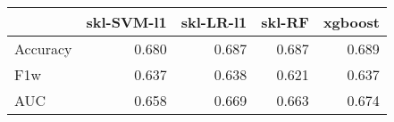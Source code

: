 \begin{tabular}{lrrrr}
\toprule
{} &  skl-SVM-l1 &  skl-LR-l1 &  skl-RF &  xgboost \\
\midrule
Accuracy &       0.680 &      0.687 &   0.687 &    0.689 \\
F1w      &       0.637 &      0.638 &   0.621 &    0.637 \\
AUC      &       0.658 &      0.669 &   0.663 &    0.674 \\
\bottomrule
\end{tabular}

